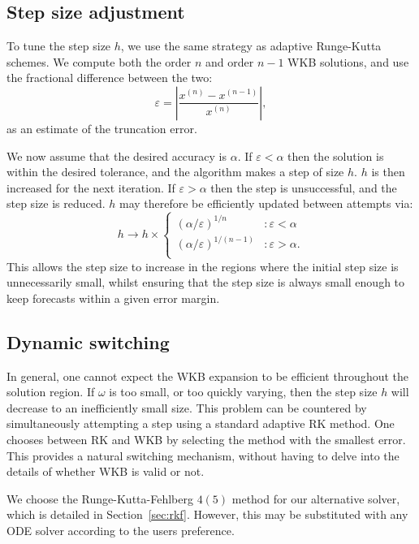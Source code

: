 \subsection{Step size adjustment}
To tune the step size \(h\), we use the same strategy as adaptive Runge-Kutta schemes. We compute both the order \(n\) and order \(n-1\) WKB solutions, and use the fractional difference between the two:
\begin{equation}
  \varepsilon = \left|\frac{x^{(n)}-x^{(n-1)}}{x^{(n)}}\right|,
  \nonumber
\end{equation}
as an estimate of the truncation error. 

We now assume that the desired accuracy is \(\alpha\). If \(\varepsilon<\alpha\) then the solution is within the desired tolerance, and the algorithm makes a step of size \(h\). \(h\) is then increased for the next iteration. If \(\varepsilon>\alpha\) then the step is unsuccessful, and the step size is reduced. \(h\) may therefore be efficiently updated between attempts via:
\begin{equation}
  h \to h\times\left\{
  \begin{array}{lr}
    {(\alpha/\varepsilon)}^{1/n} &: \varepsilon<\alpha \\
    {(\alpha/\varepsilon)}^{1/(n-1)} &: \varepsilon>\alpha. \\
  \end{array}
  \right.\label{eqn:h_update}
\end{equation}
This allows the step size to increase in the regions where the initial step size is unnecessarily small, whilst ensuring that the step size is always small enough to keep forecasts within a given error margin.

\subsection{Dynamic switching}
In general, one cannot expect the WKB expansion to be efficient throughout the solution region. If \(\omega\) is too small, or too quickly varying, then the step size \(h\) will decrease to an inefficiently small size. This problem can be countered by simultaneously attempting a step using a standard adaptive RK method. One chooses between RK and WKB by selecting the method with the smallest error. This provides a natural switching mechanism, without having to delve into the details of whether WKB is valid or not.

We choose the Runge-Kutta-Fehlberg \(4(5)\) method for our alternative solver, which is detailed in Section~\ref{sec:rkf}. However, this may be substituted with any ODE solver according to the users preference.

